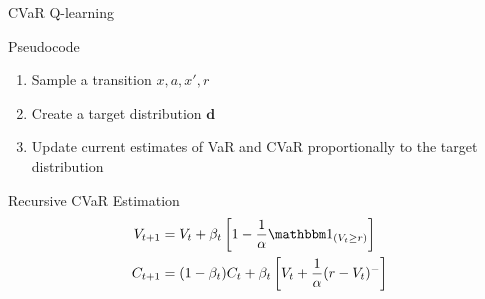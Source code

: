 \documentclass{beamer}
\begin{document}

%
%
%
%


%
%
%


\begin{frame}{CVaR Q-learning}

\begin{block}{Pseudocode}
\begin{enumerate}
\item Sample a transition $x, a, x', r$
\item Create a target distribution $\mathbf{d}$

\item Update current estimates of VaR and CVaR proportionally to the target distribution

\end{enumerate}
\end{block}


\begin{block}{Recursive CVaR Estimation}
\begin{align*}
V_{t+1} &= V_{t} + \beta_t \bsquare{1-\dfrac{1}{\alpha}\indicator_{(V_t \ge r)}}\\
C_{t+1} &= (1-\beta_t)C_t + \beta_t \bsquare{V_t + \dfrac{1}{\alpha}(r-V_t)^-}
\end{align*}
\end{block}
\end{frame}
\end{document}

